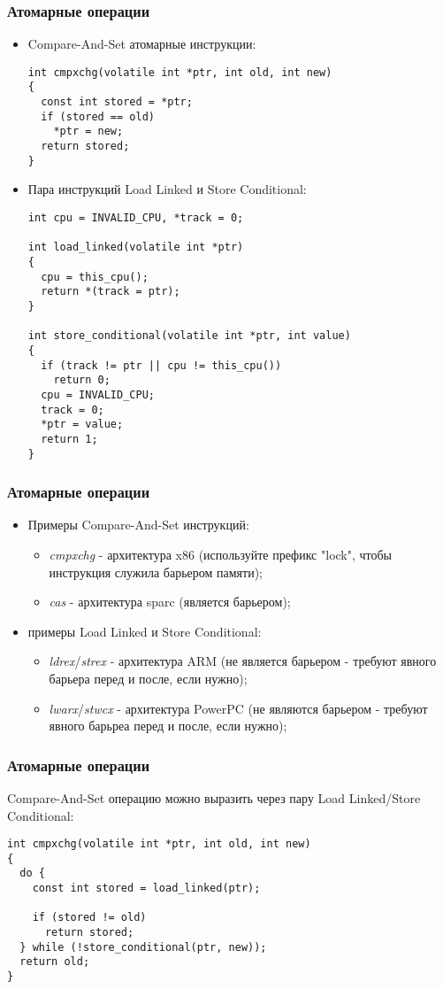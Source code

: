 \begin{frame}[fragile]
\frametitle{Атомарные операции}

\begin{itemize}
  \item Compare-And-Set атомарные инструкции:
    \begin{lstlisting}
int cmpxchg(volatile int *ptr, int old, int new)
{
  const int stored = *ptr;
  if (stored == old)
    *ptr = new;
  return stored;
}
    \end{lstlisting}
  \item Пара инструкций Load Linked и Store Conditional:
    \begin{lstlisting}
int cpu = INVALID_CPU, *track = 0;

int load_linked(volatile int *ptr)
{
  cpu = this_cpu();
  return *(track = ptr);
}

int store_conditional(volatile int *ptr, int value)
{
  if (track != ptr || cpu != this_cpu())
    return 0;
  cpu = INVALID_CPU;
  track = 0;
  *ptr = value;
  return 1;
}
    \end{lstlisting}
\end{itemize}
\end{frame}

\begin{frame}
\frametitle{Атомарные операции}

\begin{itemize}
  \item Примеры Compare-And-Set инструкций:
        \begin{itemize}
          \item \emph{cmpxchg} - архитектура x86 (используйте префикс "lock",
                чтобы инструкция служила барьером памяти);
          \item \emph{cas} - архитектура sparc (является барьером);
        \end{itemize}
  \item примеры Load Linked и Store Conditional:
        \begin{itemize}
          \item \emph{ldrex}/\emph{strex} - архитектура ARM (не является
                барьером - требуют явного барьера перед и после, если нужно);
          \item \emph{lwarx}/\emph{stwcx} - архитектура PowerPC (не являются
                барьером - требуют явного барьреа перед и после, если нужно);
        \end{itemize}
\end{itemize}
\end{frame}

\begin{frame}[fragile]
\frametitle{Атомарные операции}

Compare-And-Set операцию можно выразить через пару Load Linked/Store
Conditional:
\begin{lstlisting}
int cmpxchg(volatile int *ptr, int old, int new)
{
  do {
    const int stored = load_linked(ptr);

    if (stored != old)
      return stored;
  } while (!store_conditional(ptr, new));
  return old;
}
\end{lstlisting}
\end{frame}
